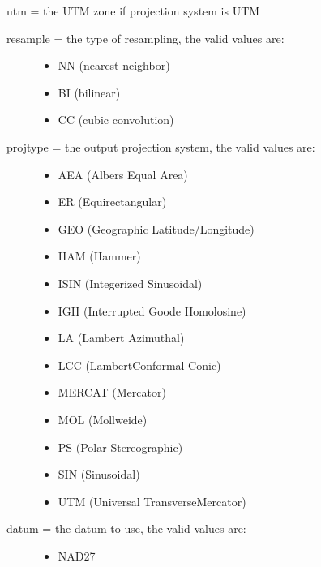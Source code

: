\documentclass[a4paper,11pt,oneside]{sphinxmanual}
\begin{document}
\begin{fulllineitems}
\begin{fulllineitems}
utm = the UTM zone if projection system is UTM
\begin{description}
\item[{resample = the type of resampling, the valid values are:}] \leavevmode\begin{itemize}
\item {} 
NN (nearest neighbor)

\item {} 
BI (bilinear)

\item {} 
CC (cubic convolution)

\end{itemize}

\item[{projtype = the output projection system, the valid values are:}] \leavevmode\begin{itemize}
\item {} 
AEA (Albers Equal Area)

\item {} 
ER (Equirectangular)

\item {} 
GEO (Geographic Latitude/Longitude)

\item {} 
HAM (Hammer)

\item {} 
ISIN (Integerized Sinusoidal)

\item {} 
IGH (Interrupted Goode Homolosine)

\item {} 
LA (Lambert Azimuthal)

\item {} 
LCC (LambertConformal Conic)

\item {} 
MERCAT (Mercator)

\item {} 
MOL (Mollweide)

\item {} 
PS (Polar Stereographic)

\item {} 
SIN (Sinusoidal)

\item {} 
UTM (Universal TransverseMercator)

\end{itemize}

\item[{datum = the datum to use, the valid values are:}] \leavevmode\begin{itemize}
\item {} 
NAD27


\end{itemize}
\end{description}
\end{fulllineitems}
\end{fulllineitems}
\end{document}
